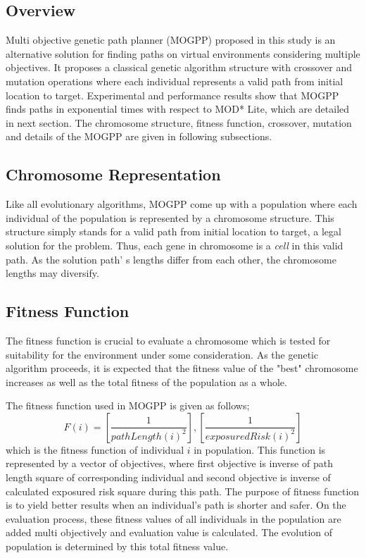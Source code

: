 \subsection{Overview}

Multi objective genetic path planner (MOGPP) proposed in this study is an alternative solution for finding paths on virtual environments considering multiple objectives. It proposes a classical genetic algorithm structure with crossover and mutation operations where each individual represents a valid path from initial location to target. Experimental and performance results show that MOGPP finds paths in exponential times with respect to MOD* Lite, which are detailed in next section. The chromosome structure, fitness function, crossover, mutation and details of the MOGPP are given in following subsections.

\subsection{Chromosome Representation}

Like all evolutionary algorithms, MOGPP come up with a population where each individual of the population is represented by a chromosome structure. This structure simply stands for a valid path from initial location to target, a legal solution for the problem. Thus, each gene in chromosome is a \textit{cell} in this valid path. As the solution path' s lengths differ from each other, the chromosome lengths may diversify.

\subsection{Fitness Function}

The fitness function is crucial to evaluate a chromosome which is tested for suitability for the environment under some consideration. As the genetic algorithm proceeds, it is expected that the fitness value of the "best" chromosome increases as well as the total fitness of the population as a whole.

The fitness function used in MOGPP is given as follows; \[F(i) = [\dfrac{1}{pathLength(i)^{2}}], [\dfrac{1}{exposuredRisk(i)^{2}}] \] which is the fitness function of individual $i$ in population. This function is represented by a vector of objectives, where first objective is inverse of path length square of corresponding individual and second objective is inverse of calculated exposured risk square during this path. The purpose of fitness function is to yield better results when an individual's path is shorter and safer. On the evaluation process, these fitness values of all individuals in the population are added multi objectively and evaluation value is calculated. The evolution of population is determined by this total fitness value.


